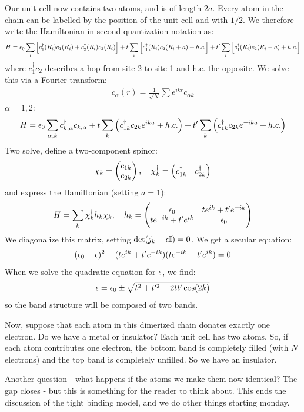 Our unit cell now contains two atoms, and is of length $2a$. Every atom in the chain can be labelled by the position of the unit cell and with $1/2$. We therefore write the Hamiltonian in second quantization notation as:
\begin{equation}
    H = \epsilon_0 \sum_i \left[c_1^\dagger(R_i)c_1(R_i) + c_2^\dagger(R_i)c_2(R_i)\right] + t\sum_i\left[c_1^\dagger(R_i)c_2(R_i + a) + h.c.\right] + t'\sum_i \left[c_1^\dagger(R_i)c_2(R_i - a) + h.c.\right]
\end{equation}
where $c_1^\dag c_2$ describes a hop from site 2 to site 1 and h.c. the opposite. We solve this via a Fourier transform:
\begin{align*}
    c_\alpha(r) = \frac{1}{\sqrt{N}}\sum e^{ikr}c_{\alpha k}
\end{align*}
$\alpha = 1, 2$:
\begin{equation}
    H = \epsilon_0\sum_{\alpha, k}c^\dagger_{k, \alpha}c_{k, \alpha} + t\sum_k \left(c^\dagger_{1k}c_{2k}e^{ika} + h.c.\right) + t'\sum_k \left(c^\dagger_{1k}c_{2k}e^{-ika} + h.c.\right)
\end{equation}
Two solve, define a two-component spinor:
\begin{align*}
    \chi_k = \begin{pmatrix}c_{1k} \\ c_{2k}\end{pmatrix}, \quad \chi_k^\dagger = \begin{pmatrix}c^\dagger_{1k} & c^\dagger_{2k}\end{pmatrix}
\end{align*}
and express the Hamiltonian (setting $a = 1$):
\begin{equation}
    H = \sum_k \chi_k^\dagger h_k\chi_k, \quad  h_k = \begin{pmatrix}\epsilon_0 & te^{ik} + t'e^{-ik} \\ te^{-ik} + t'e^{ik} & \epsilon_0\end{pmatrix}
\end{equation}
We diagonalize this matrix, setting $\det(j_k - \epsilon\mathbb{I}) = 0$. We get a secular equation:
\begin{align*}
    (\epsilon_0 - \epsilon)^2 - (te^{ik} + t'e^{-ik})(te^{-ik} + t'e^{ik}) = 0
\end{align*}
When we solve the quadratic equation for $\epsilon$, we find:
\begin{equation}
    \epsilon = \epsilon_0 \pm \sqrt{t^2 + t'^2 + 2tt'\cos(2k)}
\end{equation}
so the band structure will be composed of two bands.

Now, suppose that each atom in this dimerized chain donates exactly one electron. Do we have a metal or insulator? Each unit cell has two atoms. So, if each atom contributes one electron, the bottom band is completely filled (with $N$ electrons) and the top band is completely unfilled. So we have an insulator.

Another question - what happens if the atoms we make them now identical? The gap closes - but this is something for the reader to think about. This ends the discussion of the tight binding model, and we do other things starting monday.